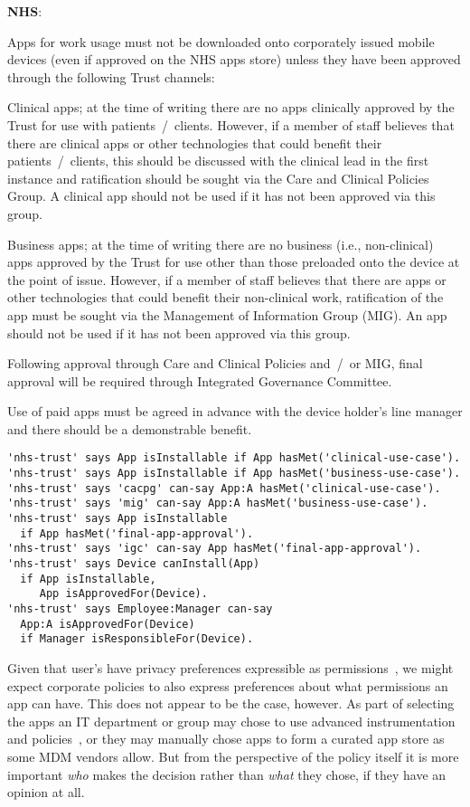 \documentclass{llncs}
\newenvironment{policyrule}[1]{%
  \begin{mdframed}\footnotesize
      \noindent\textbf{\sffamily #1}:~\itshape%
}{%
  \end{mdframed}
}
\begin{document}
\begin{policyrule}{NHS}
  Apps for work usage must not be downloaded onto corporately issued
  mobile devices (even if approved on the NHS apps store) unless they have
  been approved through the following Trust channels:
  
  Clinical apps; at the time of writing there are no apps clinically
  approved by the Trust for use with patients~/~clients. However, if a
  member of staff believes that there are clinical apps or other
  technologies that could benefit their patients~/~clients, this should be
  discussed with the clinical lead in the first instance and ratification
  should be sought via the Care and Clinical Policies Group. A clinical
  app should not be used if it has not been approved via this group.
  
  Business apps; at the time of writing there are no business (i.e.,
  non-clinical) apps approved by the Trust for use other than those
  preloaded onto the device at the point of issue. However, if a member of
  staff believes that there are apps or other technologies that could
  benefit their non-clinical work, ratification of the app must be sought
  via the Management of Information Group (MIG). An app should not be used
  if it has not been approved via this group.

  Following approval through Care and Clinical Policies and~/~or MIG, final
  approval will be required through Integrated Governance Committee.

  Use of paid apps must be agreed in advance with the device holder's line
  manager and there should be a demonstrable benefit.
  \normalfont
  \begin{lstlisting}
'nhs-trust' says App isInstallable if App hasMet('clinical-use-case').
'nhs-trust' says App isInstallable if App hasMet('business-use-case').
'nhs-trust' says 'cacpg' can-say App:A hasMet('clinical-use-case').
'nhs-trust' says 'mig' can-say App:A hasMet('business-use-case').
'nhs-trust' says App isInstallable
  if App hasMet('final-app-approval').
'nhs-trust' says 'igc' can-say App hasMet('final-app-approval').
'nhs-trust' says Device canInstall(App)
  if App isInstallable,
     App isApprovedFor(Device).
'nhs-trust' says Employee:Manager can-say
  App:A isApprovedFor(Device)
  if Manager isResponsibleFor(Device).
  \end{lstlisting}
\end{policyrule}
Given that user's have privacy preferences expressible as permissions~\cite{lin_modeling_2014}, we might expect corporate policies to also express preferences about what permissions an app can have.
This does not appear to be the case, however. 
As part of selecting the apps an IT department or group may chose to use advanced instrumentation and policies~\cite{armando_enabling_2014}, or they may manually chose apps to form a curated app store as some \ac{MDM} vendors allow.
But from the perspective of the policy itself it is more important \emph{who} makes the decision rather than \emph{what} they chose, if they have an opinion at all.
\end{document}
